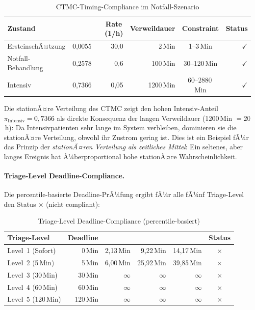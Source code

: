﻿\documentclass[a4paper,12pt]{scrreprt}
\theoremstyle{definition}
\begin{document}
\begin{table}[H]
	\centering
	\begin{tabular}{@{}lrrrcr@{}}
		\toprule
		\textbf{Zustand} & \boldmath{$\pi_i$} & \textbf{Rate}\,(1/h) &
		\textbf{Verweildauer} & \textbf{Constraint} & \textbf{Status} \\
		\midrule
		ErsteinschÃ¤tzung  & 0{,}0055 & 30{,}0 &  2\,Min & 1--3\,Min   & $\checkmark$ \\
		Notfall-Behandlung& 0{,}2578 &  0{,}6 & 100\,Min& 30--120\,Min& $\checkmark$ \\
		Intensiv          & 0{,}7366 & 0{,}05 &1200\,Min& 60--2880\,Min&$\checkmark$ \\
		\bottomrule
	\end{tabular}
	\caption{CTMC-Timing-Compliance im Notfall-Szenario}
	\label{tab:ctmc-compliance-auswertung}
\end{table}

Die stationÃ¤re Verteilung des CTMC zeigt den hohen Intensiv-Anteil
$\pi_\text{Intensiv} = 0{,}7366$ als direkte Konsequenz der langen
Verweildauer (1200\,Min $= 20$\,h): Da Intensivpatienten sehr lange
im System verbleiben, dominieren sie die stationÃ¤re Verteilung,
obwohl ihr Zustrom gering ist. Dies ist ein Beispiel fÃ¼r das Prinzip
der \emph{stationÃ¤ren Verteilung als zeitliches Mittel}: Ein seltenes,
aber langes Ereignis hat Ã¼berproportional hohe stationÃ¤re Wahrscheinlichkeit.

\paragraph{Triage-Level Deadline-Compliance.}
Die percentile-basierte Deadline-PrÃ¼fung ergibt fÃ¼r alle fÃ¼nf Triage-Level
den Status $\times$ (nicht compliant):

\begin{table}[H]
	\centering
	\begin{tabular}{@{}lrrrrc@{}}
		\toprule
		\textbf{Triage-Level} & \textbf{Deadline} & \boldmath{$t_{0{,}50}$} &
		\boldmath{$t_{0{,}95}$} & \boldmath{$t_{0{,}99}$} & \textbf{Status} \\
		\midrule
		Level~1 (Sofort)   & 0\,Min  &  2{,}13\,Min &  9{,}22\,Min & 14{,}17\,Min & $\times$ \\
		Level~2 (5\,Min)   & 5\,Min  &  6{,}00\,Min & 25{,}92\,Min & 39{,}85\,Min & $\times$ \\
		Level~3 (30\,Min)  & 30\,Min & $\infty$     & $\infty$     & $\infty$     & $\times$ \\
		Level~4 (60\,Min)  & 60\,Min & $\infty$     & $\infty$     & $\infty$     & $\times$ \\
		Level~5 (120\,Min) &120\,Min & $\infty$     & $\infty$     & $\infty$     & $\times$ \\
		\bottomrule
	\end{tabular}
	\caption{Triage-Level Deadline-Compliance (percentile-basiert)}
	\label{tab:triage-compliance}
\end{table}
\end{document}
